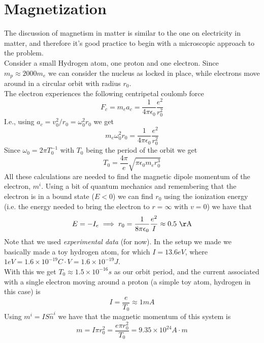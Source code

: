 \documentclass[../electromagnetism.tex]{subfiles}
\begin{document}
\section{Magnetization}
The discussion of magnetism in matter is similar to the one on electricity in matter, and therefore it's good practice to begin with a microscopic approach to the problem.\\
Consider a small Hydrogen atom, one proton and one electron. Since $m_p\approx2000m_e$ we can consider the nucleus as locked in place, while electrons move around in a circular orbit with radius $r_0$.\\
The electron experiences the following centripetal coulomb force
\begin{equation*}
	F_c=m_ea_c=\frac{1}{4\pi\epsilon_0}\frac{e^2}{r_0^2}
\end{equation*}
I.e., using $a_c=v^2_0/r_0=\omega_0^2r_0$ we get
\begin{equation*}
	m_e\omega_0^2r_0=\frac{1}{4\pi\epsilon_0}\frac{e^2}{r_0^2}
\end{equation*}
Since $\omega_0=2\pi T_0^{-1}$ with $T_0$ being the period of the orbit we get
\begin{equation*}
	T_0=\frac{4\pi}{e}\sqrt{\pi\epsilon_0m_er_0^3}
\end{equation*}
All these calculations are needed to find the magnetic dipole momentum of the electron, $m^i$. Using a bit of quantum mechanics and remembering that the electron is in a bound state ($E<0$) we can find $r_0$ using the ionization energy (i.e. the energy needed to bring the electron to $r=\infty$ with $v=0$) we have that
\begin{equation*}
	E=-I_e\implies r_0=\frac{1}{8\pi\epsilon_0}\frac{e^2}{I}\approx0.5\unit{\AA}
\end{equation*}
Note that we used \textit{experimental data} (for now). In the setup we made we basically made a toy hydrogen atom, for which $I=13.6\unit{eV}$, where $1\unit{eV}=1.6\times10^{-19}\unit{C\cdot V}=1.6\times10^{-19}\unit{J}$.\\
With this we get $T_0\approx1.5\times10^{-16}\unit{s}$ as our orbit period, and the current associated with a single electron moving around a proton (a simple toy atom, hydrogen in this case) is
\begin{equation*}
	I=\frac{e}{T_0}\approx 1\unit{mA}
\end{equation*}
Using $m^i=IS\hat{n}^i$ we have that the magnetic momentum of this system is
\begin{equation*}
	m=I\pi r_0^2=\frac{e\pi r_0^2}{T_0}=9.35\times10^{24}\unit{A\cdot m}
\end{equation*}
\end{document}
